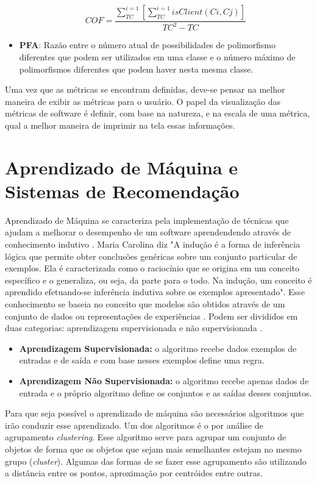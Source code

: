 \begin{itemize}
\begin{equation}
COF = \frac{\sum_{TC}^{i=1}[\sum_{TC}^{i=1}isClient(Ci,Cj)]}{TC^2-TC}
\end{equation}
\item \textbf{PFA}: Razão entre o número atual de possibilidades de polimorfismo diferentes que podem ser utilizados em uma classe e o número máximo de polimorfismos diferentes que podem haver nesta mesma classe.
\end{itemize}

Uma vez que as métricas se encontram definidas, deve-se pensar na melhor maneira de exibir as métricas para o usuário. O papel da visualização das métricas de software é definir, com base na natureza, e na escala de uma métrica, qual a melhor maneira de imprimir na tela essas informações.

\section{Aprendizado de Máquina e Sistemas de Recomendação}
Aprendizado de Máquina se caracteriza pela implementação de técnicas que ajudam a melhorar o desempenho de um software aprendendendo através de conhecimento indutivo \cite{mitchell1997mcgraw}. Maria Carolina \cite{monard2003conceitos} diz "A indução é a forma de inferência lógica que permite obter conclusões genéricas sobre um conjunto particular de exemplos. Ela é caracterizada como o raciocínio que se origina em um conceito específico e o generaliza, ou seja, da parte para o todo. Na indução, um conceito é aprendido efetuando-se inferência indutiva sobre os exemplos apresentado". Esse conhecimento se baseia no conceito que modelos são obtidos através de um conjunto de dados ou representações de experiências \cite{peres2012tutorial}. Podem ser divididos em duas categorias: aprendizagem supervisionada e não supervisionada \cite{russell2009artificial}.
\begin{itemize}
\item\textbf{Aprendizagem Supervisionada:} o algoritmo recebe dados exemplos de entradas e de saída e com base nesses exemplos define uma regra.
\item\textbf{Aprendizagem Não Supervisionada: } o algoritmo recebe apenas dados de entrada e o próprio algoritmo define os conjuntos e as saídas desses conjuntos.
\end{itemize}

Para que seja possível o aprendizado de máquina são necessários algoritmos que irão conduzir esse aprendizado. Um dos algoritmos é o por análise de agrupamento \textit{clustering}. Esse algoritmo serve para agrupar um conjunto de objetos de forma que os objetos que sejam mais semelhantes estejam no mesmo grupo (\textit{cluster}). Algumas das formas de se fazer esse agrupamento são utilizando a distância entre os pontos, aproximação por centróides entre outras.

